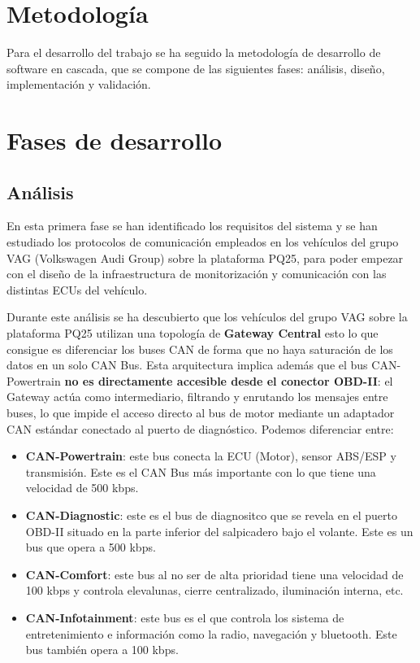 \section{Metodología}

Para el desarrollo del trabajo se ha seguido la metodología de desarrollo de software en cascada, que se compone de las siguientes fases: análisis, diseño, implementación y validación.

\section{Fases de desarrollo}

\subsection{Análisis}

En esta primera fase se han identificado los requisitos del sistema y se han estudiado los protocolos de comunicación empleados en los vehículos del grupo VAG (Volkswagen Audi Group) sobre la plataforma PQ25, para poder empezar con el diseño de la infraestructura de monitorización y comunicación con las distintas ECUs del vehículo.

Durante este análisis se ha descubierto que los vehículos del grupo VAG sobre la plataforma PQ25 utilizan una topología de \textbf{Gateway Central} esto lo que consigue es diferenciar los buses CAN de forma que no haya saturación de los datos en un solo CAN Bus. Esta arquitectura implica además que el bus CAN-Powertrain \textbf{no es directamente accesible desde el conector OBD-II}: el Gateway actúa como intermediario, filtrando y enrutando los mensajes entre buses, lo que impide el acceso directo al bus de motor mediante un adaptador CAN estándar conectado al puerto de diagnóstico. Podemos diferenciar entre:
\begin{itemize}
    \item \textbf{CAN-Powertrain}: este bus conecta la ECU (Motor), sensor ABS/ESP y transmisión. Este es el CAN Bus más importante con lo que tiene una velocidad de 500 kbps.
    \item \textbf{CAN-Diagnostic}: este es el bus de diagnositco que se revela en el puerto OBD-II situado en la parte inferior del salpicadero bajo el volante. Este es un bus que opera a 500 kbps.
    \item \textbf{CAN-Comfort}: este bus al no ser de alta prioridad tiene una velocidad de 100 kbps y controla elevalunas, cierre centralizado, iluminación interna, etc.
    \item \textbf{CAN-Infotainment}: este bus es el que controla los sistema de entretenimiento e información como la radio, navegación y bluetooth. Este bus también opera a 100 kbps.
\end{itemize}

